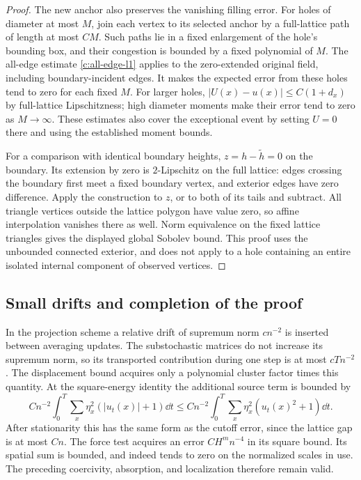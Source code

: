 \begin{proof}
The new anchor also preserves the vanishing filling error.
For holes of diameter at most $M$, join each vertex to its
selected anchor by a full-lattice path of length at most $CM$.
Such paths lie in a fixed enlargement of the hole's bounding
box, and their congestion is bounded by a fixed polynomial of
$M$. The all-edge estimate \eqref{c:all-edge-l1} applies to
the zero-extended original field, including boundary-incident
edges. It makes the expected error from these holes tend to
zero for each fixed $M$. For larger holes,
$|U(x)-u(x)|\le C(1+d_x)$ by full-lattice Lipschitzness; high
diameter moments make their error tend to zero as $M\to\infty$.
These estimates also cover the exceptional event by setting
$U=0$ there and using the established moment bounds.

For a comparison with identical boundary heights,
$z=h-\widetilde h=0$ on the boundary. Its extension by zero
is $2$-Lipschitz on the full lattice: edges crossing the
boundary first meet a fixed boundary vertex, and exterior
edges have zero difference. Apply the construction to $z$,
or to both of its tails and subtract. All triangle vertices
outside the lattice polygon have value zero, so affine
interpolation vanishes there as well. Norm equivalence on
the fixed lattice triangles gives the displayed global
Sobolev bound. This proof uses the unbounded connected
exterior, and does not apply to a hole containing an entire
isolated internal component of observed vertices.
\end{proof}

\subsection{Small drifts and completion of the proof}

In the projection scheme a relative drift of supremum norm
$c n^{-2}$ is inserted between averaging updates. The substochastic
matrices do not increase its supremum norm, so its transported
contribution during one step is at most $cTn^{-2}$. The displacement
bound acquires only a polynomial cluster factor times this quantity.
At the square-energy identity the additional source term is bounded by
\[
 C n^{-2}\int_0^T\sum_x\eta_x^2(|u_t(x)|+1)\dd t
 \le C n^{-2}\int_0^T\sum_x\eta_x^2(u_t(x)^2+1)\dd t.
\]
After stationarity this has the same form as the cutoff error, since
the lattice gap is at most $Cn$. The force test acquires an error
$C H^m n^{-4}$ in its square bound. Its spatial sum is bounded, and
indeed tends to zero on the normalized scales in use. The preceding
coercivity, absorption, and localization therefore remain valid.

